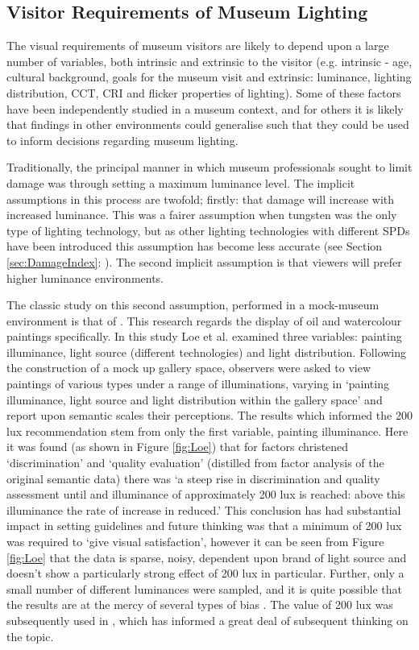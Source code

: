 \clearpage
\subsection{Visitor Requirements of Museum Lighting}

The visual requirements of museum visitors are likely to depend upon a large number of variables, both intrinsic and extrinsic to the visitor (e.g. intrinsic - age, cultural background, goals for the museum visit and extrinsic: luminance, lighting distribution, \gls{CCT}, \gls{CRI} and flicker properties of lighting). Some of these factors have been independently studied in a museum context, and for others it is likely that findings in other environments could generalise such that they could be used to inform decisions regarding museum lighting.

Traditionally, the principal manner in which museum professionals sought to limit damage was through setting a maximum luminance level. The implicit assumptions in this process are twofold; firstly: that damage will increase with increased luminance. This was a fairer assumption when tungsten was the only type of lighting technology, but as other lighting technologies with different \glspl{SPD} have been introduced this assumption has become less accurate (see Section \ref{sec:DamageIndex}: ). The second implicit assumption is that viewers will prefer higher luminance environments.

The classic study on this second assumption, performed in a mock-museum environment is that of \citet{loe_preferred_1982}. This research regards the display of oil and watercolour paintings specifically. In this study Loe et al. examined three variables: painting illuminance, light source (different technologies) and light distribution. Following the construction of a mock up gallery space, observers were asked to view paintings of various types under a range of illuminations, varying in `painting illuminance, light source and light distribution within the gallery space' and report upon semantic scales their perceptions. The results which informed the 200 lux recommendation stem from only the first variable, painting illuminance. Here it was found (as shown in Figure \ref{fig:Loe}) that for factors christened `discrimination' and `quality evaluation' (distilled from factor analysis of the original semantic data) there was `a steep rise in discrimination and quality assessment until and illuminance of approximately 200 lux is reached: above this illuminance the rate of increase in reduced.' This conclusion has had substantial impact in setting guidelines and future thinking was that a minimum of 200 lux was required to `give visual satisfaction', however it can be seen from Figure \ref{fig:Loe} that the data is sparse, noisy, dependent upon brand of light source and doesn't show a particularly strong effect of 200 lux in particular. Further, only a small number of different luminances were sampled, and it is quite possible that the results are at the mercy of several types of bias \citep{fotios_research_2009}. The value of 200 lux was subsequently used in \citet{thomson_museum_1978}, which has informed a great deal of subsequent thinking on the topic.

